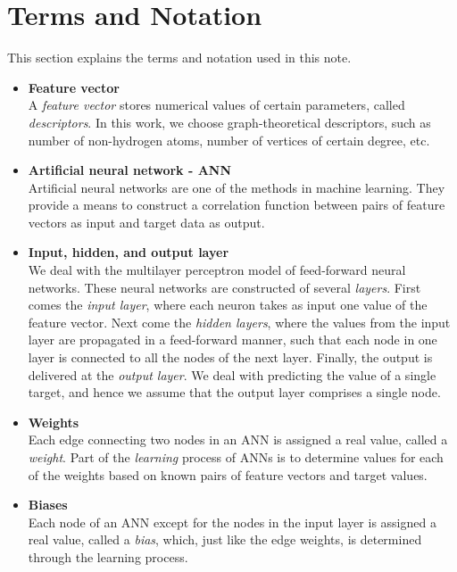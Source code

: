 \documentclass[11pt, titlepage, dvipdfmx, twoside]{article}
\begin{document}

\section{Terms and Notation}
\label{sec:Pre}
%
This section explains the terms and notation used in this note.


\begin{itemize}

\item {\bf Feature vector}\\
%
A {\em feature vector} stores numerical values of certain parameters,
called {\em descriptors}.
In this work, we choose graph-theoretical descriptors, such as number of 
non-hydrogen atoms, number of vertices of certain degree, etc.

\item {\bf Artificial neural network - ANN}\\
%
Artificial neural networks are one of the methods in machine learning.
They provide a means to construct a correlation function between 
pairs of feature vectors as input and target data as output.


\item {\bf Input, hidden, and output layer}\\
%
We deal with the multilayer perceptron model 
of feed-forward neural networks.
These neural networks are constructed of several {\em layers}.
First comes the \emph{input layer}, where each neuron takes as input
one value of the feature vector.
Next come the \emph{hidden layers}, where the 
values from the input layer are propagated in a feed-forward manner,
such that each node in one layer is connected to all the nodes of the next layer. 
Finally, the output is delivered at the \emph{output layer}.
We deal with predicting the value of a single target,
and hence we assume that the output layer comprises a single node.

\item {\bf Weights}\\
%
Each edge connecting two nodes in an ANN is assigned a real value,
called a \emph{weight}.
Part of the \emph{learning} process of ANNs is to determine values for each of the weights
based on known pairs of feature vectors and target values.

\item {\bf Biases}\\
Each node of an ANN except for the nodes in the input layer
is assigned a real value, called a {\em bias},
which, just like the edge weights, is determined through the learning process.



\end{itemize}
\end{document}
